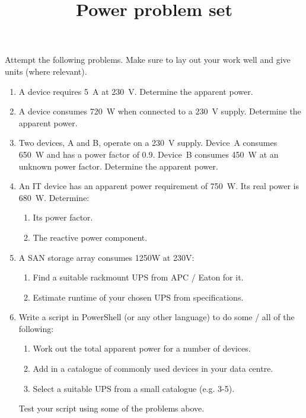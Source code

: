 \documentclass{pgnotes}
\title{Power problem set}
\begin{document}
\maketitle

Attempt the following problems.
Make sure to lay out your work well and give units (where relevant).

\begin{enumerate}

  
\item
  A device requires \SI{5}{\ampere} at \SI{230}{\volt}. Determine the apparent power.

\item
  A device consumes \SI{720}{\watt} when connected to a \SI{230}{\volt} supply. Determine the apparent power.

\item
  Two devices, A and B, operate on a \SI{230}{\volt} supply.
  Device~A consumes \SI{650}{\watt} and has a power factor of 0.9.
  Device~B consumes \SI{450}{\watt} at an unknown power factor.
  Determine the apparent power.

\item
  An IT device has an apparent power requirement of \SI{750}{\watt}.
  Its real power is \SI{680}{\watt}.
  Determine:
  \begin{enumerate}
  \item Its power factor.
  \item The reactive power component.
  \end{enumerate}

\item 
  A SAN storage array consumes 1250W at 230V:
  \begin{enumerate}
  \item Find a suitable rackmount UPS from APC / Eaton for it.
  \item Estimate runtime of your chosen UPS from specifications.
  \end{enumerate}

\item
  Write a script in PowerShell (or any other language) to do some / all of the following:
  \begin{enumerate}
  \item Work out the total apparent power for a number of devices.
  \item Add in a catalogue of commonly used devices in your data centre.
  \item Select a suitable UPS from a small catalogue (e.g. 3-5).
  \end{enumerate}
  Test your script using some of the problems above.
  
\end{enumerate}
\end{document}
